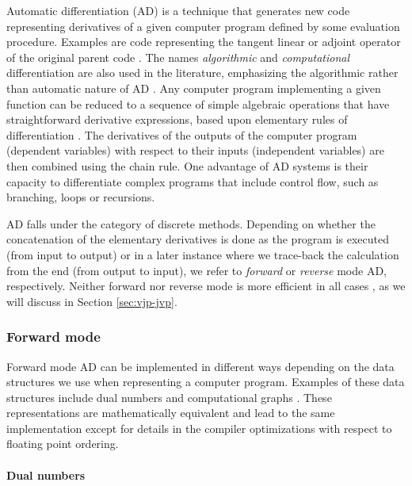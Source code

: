 Automatic differentiation (AD) is a technique that generates new code representing derivatives of a given computer program defined by some evaluation procedure. 
Examples are code representing the tangent linear or adjoint operator of the original parent code \cite{Griewank:2008kh}. 
The names \textit{algorithmic} and \textit{computational} differentiation are also used in the literature, emphasizing the algorithmic rather than automatic nature of AD \cite{Griewank:2008kh, Naumann.2011, Margossian.2019}. 
Any computer program implementing a given function can be reduced to a sequence of simple algebraic operations that have straightforward derivative expressions, based upon elementary rules of differentiation \cite{juedes1991taxonomy}.
The derivatives of the outputs of the computer program (dependent variables) with respect to their inputs (independent variables) are then combined using the chain rule.
One advantage of AD systems is their capacity to differentiate complex programs that include control flow, such as branching, loops or recursions. 

AD falls under the category of discrete methods.
Depending on whether the concatenation of the elementary derivatives is done as the program is executed (from input to output) or in a later instance where we trace-back the calculation from the end (from output to input), we refer to \textit{forward} or \textit{reverse} mode AD, respectively.
Neither forward nor reverse mode is more efficient in all cases \cite{Griewank_1989}, as we will discuss in Section \ref{sec:vjp-jvp}.

\subsubsection{Forward mode}

Forward mode AD can be implemented in different ways depending on the data structures we use when representing a computer program. 
Examples of these data structures include dual numbers and computational graphs \cite{Baydin_Pearlmutter_Radul_Siskind_2015}. 
These representations are mathematically equivalent and lead to the same implementation except for details in the compiler optimizations with respect to floating point ordering.

\paragraph{Dual numbers}
\label{section:dual-numbers}

